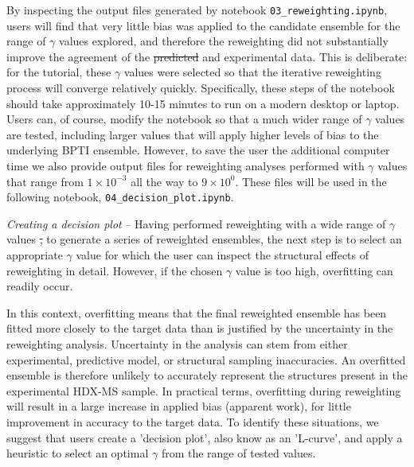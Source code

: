 \documentclass[9pt,tutorial]{livecoms}
\providecommand{\DIFadd}[1]{{\protect\color{blue}\uwave{#1}}} %
\providecommand{\DIFdel}[1]{{\protect\color{red}\sout{#1}}}                      %
\providecommand{\DIFaddbegin}{} %
\providecommand{\DIFaddend}{} %
\providecommand{\DIFdelbegin}{} %
\providecommand{\DIFdelend}{} %
\begin{document}
By inspecting the output files generated by notebook \texttt{03\_reweighting.ipynb}, users will find that very little bias was applied to the candidate ensemble for the range of $\gamma$ values explored, and therefore the reweighting did not substantially improve the agreement of the \DIFdelbegin \DIFdel{predicted }\DIFdelend \DIFaddbegin \DIFadd{computed }\DIFaddend and experimental data.
This is deliberate: for the tutorial, these $\gamma$ values were selected so that the iterative reweighting process will converge relatively quickly. 
Specifically, these steps of the notebook should take approximately 10-15 minutes to run on a modern desktop or laptop.
Users can, of course, modify the notebook so that a much wider range of $\gamma$ values are tested, including larger values that will apply higher levels of bias to the underlying BPTI ensemble.
However, to save the user the additional computer time we also provide output files for reweighting analyses performed with $\gamma$ values that range from $1\times10^{-3}$ all the way to $9\times10^{0}$. 
These files will be used in the following notebook, \texttt{04\_decision\_plot.ipynb}.

\noindent 
\textit{Creating a decision plot} -- Having performed reweighting with a wide range of $\gamma$ values \DIFdelbegin \DIFdel{, }\DIFdelend to generate a series of reweighted ensembles, the next step is to select an appropriate $\gamma$ value for which the user can inspect the structural effects of reweighting in detail. 
However, if the chosen $\gamma$ value is too high, overfitting can readily occur. 

In this context, overfitting means that the final reweighted ensemble has been fitted more closely to the target data than is justified by the uncertainty in the reweighting analysis. 
Uncertainty in the analysis can stem from either experimental, predictive model, or structural sampling inaccuracies. 
An overfitted ensemble is therefore unlikely to accurately represent the structures present in the experimental HDX-MS sample. 
In practical terms, overfitting during reweighting will result in a large increase in applied bias (apparent work), for little improvement in accuracy to the target data. 
To identify these situations, we suggest that users create a 'decision plot', also know as an 'L-curve', and apply a heuristic to select an optimal $\gamma$ from the range of tested values.  
\end{document}
